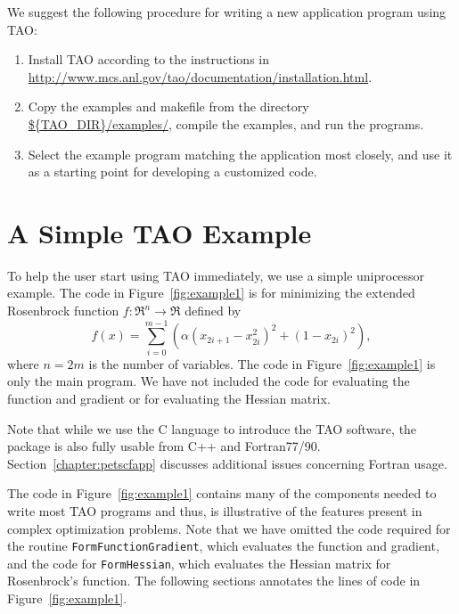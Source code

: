 We suggest the following procedure for writing a new application
program using TAO:

\begin{enumerate}
\item Install TAO according to the instructions in
  \url{http://www.mcs.anl.gov/tao/documentation/installation.html}.
\item Copy the examples and makefile from the directory
  \url{${TAO\_DIR}/examples/},%
  compile the examples, and run the programs. 
\item Select the example program matching the application most
  closely, and use it as a starting point for developing a customized
  code.
\end{enumerate}

\section{A Simple TAO Example}
\label{sec:simple}

To help the user start using TAO immediately, we use a simple
uniprocessor example. The code in
Figure~\ref{fig:example1} is for minimizing the
extended Rosenbrock function $f: \Re^n \to \Re$ defined by
\[
 f(x) = 
 \sum_{i=0}^{m-1} \left( \alpha(x_{2i+1}-x_{2i}^2)^2 + (1-x_{2i})^2 \right),
\]
where $n = 2m$ is the number of variables.  The code in
Figure~\ref{fig:example1} is only the main program.  We have not
included the code for evaluating the function and gradient or
for evaluating the Hessian matrix.


Note that while we use the C language to introduce the TAO software,
the package is also fully usable from C++ and Fortran77/90.
Section~\ref{chapter:petscfapp} discusses additional issues concerning
Fortran usage.

The code in Figure~\ref{fig:example1} contains many of the components
needed to write most TAO programs and thus, is illustrative of the
features present in complex optimization problems.  Note that we have
omitted the code required for the routine \texttt{FormFunctionGradient},
which evaluates the function and gradient, and the code for
\texttt{FormHessian}, which evaluates the Hessian matrix for Rosenbrock's
function.  The following sections annotates the lines of code in
Figure~\ref{fig:example1}.

